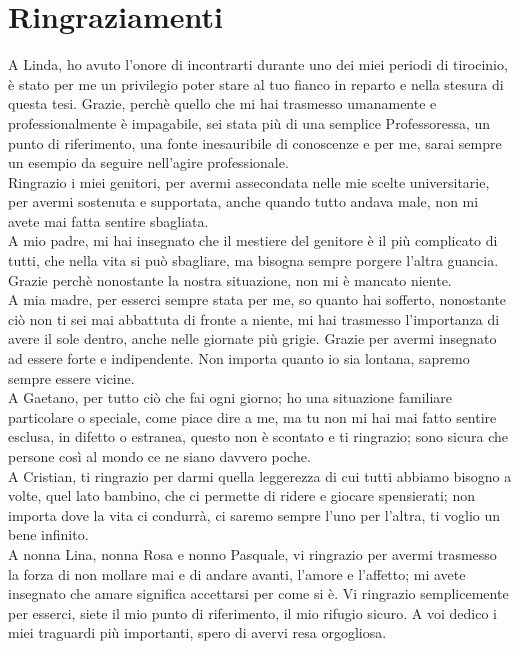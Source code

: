 \section*{Ringraziamenti}

A Linda, ho avuto l'onore di incontrarti durante uno dei miei periodi di tirocinio, è stato per me un privilegio poter
stare al tuo fianco in reparto e nella stesura di questa tesi. Grazie, perchè quello che mi hai trasmesso umanamente e
professionalmente è impagabile, sei stata più di una semplice Professoressa, un punto di riferimento,
una fonte inesauribile di conoscenze e per me, sarai sempre un esempio da seguire nell'agire professionale.\\
Ringrazio i miei genitori, per avermi assecondata nelle mie scelte universitarie, per avermi sostenuta e supportata,
anche quando tutto andava male, non mi avete mai fatta sentire sbagliata.\\
A mio padre, mi hai insegnato che il mestiere del genitore è il più complicato di tutti,
che nella vita si può sbagliare, ma bisogna sempre porgere l'altra guancia. Grazie perchè nonostante la nostra situazione,
non mi è mancato niente.\\
A mia madre, per esserci sempre stata per me, so quanto hai sofferto, nonostante ciò non ti sei mai abbattuta di fronte a 
niente, mi hai trasmesso l'importanza di avere il sole dentro, anche nelle giornate più grigie. 
Grazie per avermi insegnato ad essere forte e indipendente. Non importa quanto io sia lontana, sapremo sempre 
essere vicine.\\
A Gaetano, per tutto ciò che fai ogni giorno; ho una situazione familiare
particolare o speciale, come piace dire a me, ma tu non mi hai mai fatto sentire esclusa, in difetto o estranea,
questo non è scontato e ti ringrazio; sono sicura che persone così al mondo ce ne siano davvero poche.\\
A Cristian, ti ringrazio per darmi quella leggerezza di cui tutti abbiamo
bisogno a volte, quel lato bambino, che ci permette di ridere e giocare spensierati; non importa dove la vita ci condurrà, 
ci saremo sempre l'uno per l'altra, ti voglio un bene infinito.\\
A nonna Lina, nonna Rosa e nonno Pasquale, vi ringrazio per avermi trasmesso la forza di non mollare mai e di andare
avanti, l'amore e l'affetto; mi avete insegnato che amare significa accettarsi per come si è. Vi
ringrazio semplicemente per esserci, siete il mio punto di riferimento, il mio rifugio sicuro. A voi dedico i miei
traguardi più importanti, spero di avervi resa orgogliosa.\\
